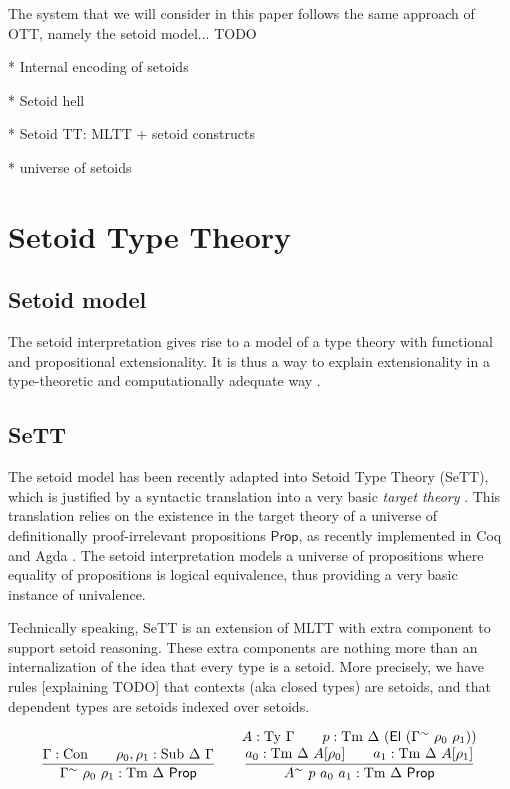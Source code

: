 \documentclass{easychair}
\newcommand{\GG}{\Gamma}
\newcommand{\DD}{\Delta}
\newcommand{\subj}[3]{#1 : \mathrm{Sub}\ #2\ #3}
\newcommand{\Prop}{\textsf{Prop}}
\newcommand{\Con}{\mathrm{Con}}
\newcommand{\Ty}{\mathrm{Ty}}
\newcommand{\Tm}{\mathrm{Tm}}
\newcommand{\El}{\textsf{El}}
\begin{document}
The system that we will consider in this paper follows the same approach of OTT,
namely the setoid model... TODO

* Internal encoding of setoids

* Setoid hell

* Setoid TT: MLTT + setoid constructs

* universe of setoids

\section{Setoid Type Theory}

\subsection{Setoid model}

The setoid interpretation gives rise to a model of a type theory with functional
and propositional extensionality. It is thus a way to explain extensionality in
a type-theoretic and computationally adequate way \cite{setoid-model}. 


\subsection{SeTT}

The setoid model has been recently adapted into Setoid Type Theory (SeTT), which
is justified by a syntactic translation into a very basic \emph{target theory}
\cite{mpc19}. This translation relies on the existence in the target theory of a
universe of definitionally proof-irrelevant propositions $\Prop$, as recently
implemented in Coq and Agda \cite{gilbert}. The setoid interpretation models a
universe of propositions where equality of propositions is logical equivalence,
thus providing a very basic instance of univalence.

Technically speaking, SeTT is an extension of MLTT with extra component to
support setoid reasoning. These extra components are nothing more than an
internalization of the idea that every type is a setoid. More precisely, we have
rules [explaining TODO] that contexts (aka closed types) are setoids, and that
dependent types are setoids indexed over setoids.

\[
\infer{
  \GG^\sim\ \rho_0\ \rho_1 : \Tm\ \DD\ \Prop
}{
  \GG : \Con \qquad \subj{\rho_0, \rho_1}{\DD}{\GG}
}
\qquad
\infer{
  A^{\sim}\ p\ a_0\ a_1 : \Tm\ \DD\ \Prop
}{
  \deduce{
    a_0 : \Tm\ \DD\ A[\rho_0] \qquad a_1 : \Tm\ \DD\ A[\rho_1]
  }{
    A : \Ty\ \GG \qquad p : \Tm\ \DD\ (\El\ (\GG^{\sim}\ \rho_0\ \rho_1))
  }
}
\]
\end{document}

